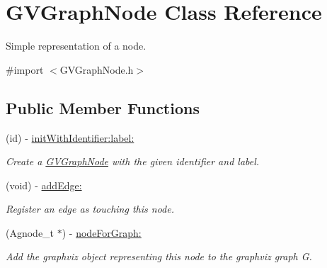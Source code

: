 \hypertarget{interface_g_v_graph_node}{
\section{GVGraphNode Class Reference}
\label{interface_g_v_graph_node}
}


Simple representation of a node.  




{\ttfamily \#import $<$GVGraphNode.h$>$}

\subsection*{Public Member Functions}
\begin{DoxyCompactItemize}
\item 
\hypertarget{interface_g_v_graph_node_ae920a973a03ea00bbbb6d72049c3c6b1}{
(id) -\/ \hyperlink{interface_g_v_graph_node_ae920a973a03ea00bbbb6d72049c3c6b1}{initWithIdentifier:label:}}
\label{interface_g_v_graph_node_ae920a973a03ea00bbbb6d72049c3c6b1}

\begin{DoxyCompactList}\small\item\em Create a \hyperlink{interface_g_v_graph_node}{GVGraphNode} with the given identifier and label. \end{DoxyCompactList}\item 
\hypertarget{interface_g_v_graph_node_a2f4362dc38096a436ff63b65f678846b}{
(void) -\/ \hyperlink{interface_g_v_graph_node_a2f4362dc38096a436ff63b65f678846b}{addEdge:}}
\label{interface_g_v_graph_node_a2f4362dc38096a436ff63b65f678846b}

\begin{DoxyCompactList}\small\item\em Register an edge as touching this node. \end{DoxyCompactList}\item 
\hypertarget{interface_g_v_graph_node_ab0d43117931f33e0ad72c059b1587a32}{
(Agnode\_\-t $\ast$) -\/ \hyperlink{interface_g_v_graph_node_ab0d43117931f33e0ad72c059b1587a32}{nodeForGraph:}}
\label{interface_g_v_graph_node_ab0d43117931f33e0ad72c059b1587a32}

\begin{DoxyCompactList}\small\item\em Add the graphviz object representing this node to the graphviz graph G. \end{DoxyCompactList}\end{DoxyCompactItemize}
